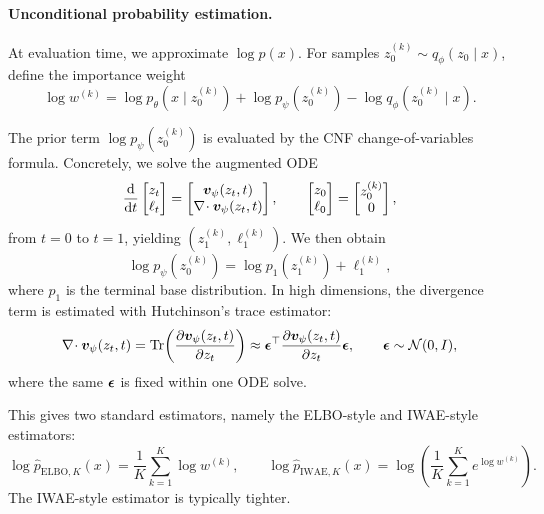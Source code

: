 \paragraph{\textbf{Unconditional probability estimation.}}
At evaluation time, we approximate \(\log p(x)\). For samples \(z_0^{(k)}\sim q_\phi(z_0\mid x)\), define the importance weight
\begin{equation}
\log w^{(k)}
=
\log p_\theta(x\mid z_0^{(k)})
+\log p_\psi(z_0^{(k)})
-\log q_\phi(z_0^{(k)}\mid x).
\label{eq:main_importance_weight}
\end{equation}

The prior term \(\log p_\psi(z_0^{(k)})\) is evaluated by the CNF change-of-variables formula. Concretely, we solve the augmented ODE
\begin{equation}
\frac{\mathrm{d}}{\mathrm{d} t}
\begin{bmatrix}
z_t \\
\ell_t
\end{bmatrix}
=
\begin{bmatrix}
\bm{v}_{\psi}(z_t,t) \\
\nabla\!\cdot \bm{v}_{\psi}(z_t,t)
\end{bmatrix},
\qquad
\begin{bmatrix}
z_0 \\
\ell_0
\end{bmatrix}
=
\begin{bmatrix}
z_0^{(k)} \\
0
\end{bmatrix},
\label{eq:main_augmented_ode}
\end{equation}
from \(t=0\) to \(t=1\), yielding \((z_1^{(k)},\ell_1^{(k)})\). We then obtain
\begin{equation}
\log p_\psi(z_0^{(k)})
=
\log p_1(z_1^{(k)})+\ell_1^{(k)},
\label{eq:main_prior_eval}
\end{equation}
where \(p_1\) is the terminal base distribution. In high dimensions, the divergence term is estimated with Hutchinson's trace estimator:
\begin{equation}
\nabla\!\cdot \bm{v}_{\psi}(z_t,t)
=
\mathrm{Tr}\!\left(\frac{\partial \bm{v}_{\psi}(z_t,t)}{\partial z_t}\right)
\approx
\bm{\epsilon}^{\top}
\frac{\partial \bm{v}_{\psi}(z_t,t)}{\partial z_t}
\bm{\epsilon},
\qquad
\bm{\epsilon}\sim\mathcal N(0,I),
\label{eq:main_hutchinson}
\end{equation}
where the same \(\bm{\epsilon}\) is fixed within one ODE solve.

This gives two standard estimators, namely the ELBO-style and IWAE-style estimators:
\begin{equation}
\log \widehat p_{\mathrm{ELBO},K}(x)
=
\frac{1}{K}\sum_{k=1}^{K}\log w^{(k)},
\qquad
\log \widehat p_{\mathrm{IWAE},K}(x)
=
\log\!\left(\frac{1}{K}\sum_{k=1}^{K}e^{\log w^{(k)}}\right).
\label{eq:main_p_estimators}
\end{equation}
The IWAE-style estimator is typically tighter.

